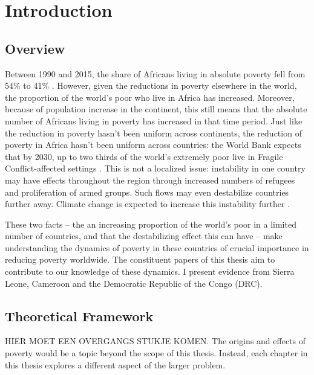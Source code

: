 \chapter{Introduction}
\section{Overview}



Between 1990 and 2015, the share of Africans living in absolute poverty fell from 54\% to 41\% \citep{Beegle2019}. However, given the reductions in poverty elsewhere in the world, the proportion of the world's poor who live in Africa has increased.  Moreover, because of population increase in the continent, this still means that the absolute number of Africans living in poverty has increased in that time period. Just like the reduction in poverty hasn't been uniform across continents, the reduction of poverty in Africa hasn't been uniform across countries: the World Bank expects that by 2030, up to two thirds of the world's extremely poor live in Fragile Conflict-affected settings \citep{WorldBank2019}. This is not a localized issue: instability in one country may have effects throughout the region through increased numbers of refugees and proliferation of armed groups. Such flows may even destabilize countries further away. Climate change is expected to increase this instability further \citep{Burke2009}.

These two facts -- the an increasing proportion of the world's poor in a limited number of countries, and that the destabilizing effect this can have -- make understanding the dynamics of poverty in these countries of crucial importance in reducing poverty worldwide. The constituent papers of this thesis aim to contribute to our knowledge of these dynamics. I present evidence from Sierra Leone, Cameroon and the Democratic Republic of the Congo (DRC).


\section{Theoretical Framework}
HIER MOET EEN OVERGANGS STUKJE KOMEN.
The origins and effects of poverty would be a topic beyond the scope of this thesis. Instead, each chapter in this thesis explores a different aspect of the larger problem. 

